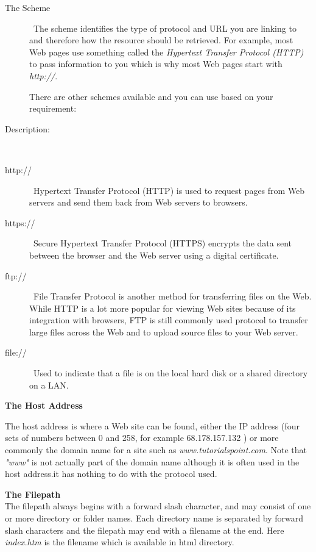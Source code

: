 \documentclass[11pt,a4paper]{article}
\begin{document}
\begin{description}
\item[The Scheme]\
The scheme identifies the type of protocol and URL you are linking to and therefore how the resource should be retrieved. For example, most Web pages use something called the \emph{Hypertext Transfer Protocol (HTTP)} to pass information to you which is why most Web pages start with \emph{http://}.

There are other schemes available and you can use based on your requirement:\

\item[Description:]\

\item[http://]\
Hypertext Transfer Protocol (HTTP) is used to request pages from Web servers and send them back from Web servers to browsers.\

\item[https://]\
Secure Hypertext Transfer Protocol (HTTPS) encrypts the data sent between the browser and the Web server using a digital certificate.\

\item[ftp://]\
File Transfer Protocol is another method for transferring files on the Web. While HTTP is a lot more popular for viewing Web sites because of its integration with browsers, FTP is still commonly used protocol to transfer large files across the Web and to upload source files to your Web server.\

\item[file://]\
Used to indicate that a file is on the local hard disk or a shared directory on a LAN.\
\end{description}

\textbf{The Host Address}\

The host address is where a Web site can be found, either the IP address (four sets of numbers between 0 and 258, for example 68.178.157.132 ) or more commonly the domain name for a site such as \emph{www.tutorialspoint.com}. Note that \emph{"www"} is not actually part of the domain name although it is often used in the host address.it has nothing to do with the protocol used.\

\textbf{The Filepath}\\

The filepath always begins with a forward slash character, and may consist of one or more directory or folder names. Each directory name is separated by forward slash characters and the filepath may end with a filename at the end. Here \emph{index.htm} is the filename which is available in html directory.\
\end{document}
